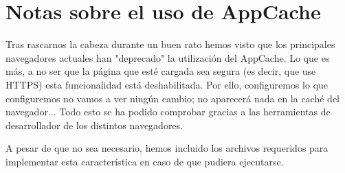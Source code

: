 \documentclass{article}[13pt]
\begin{document}
  \section{Notas sobre el uso de AppCache}
    Tras rascarnos la cabeza durante un buen rato hemos visto que los principales navegadores actuales han "deprecado" la utilización del AppCache. Lo que es más, a no ser que la página que esté cargada sea segura (es decir, que use HTTPS) esta funcionalidad está deshabilitada. Por ello, configuremos lo que configuremos no vamos a ver ningún cambio; no aparecerá nada en la caché del navegador... Todo esto se ha podido comprobar gracias a las herramientas de desarrollador de los distintos navegadores.

    A pesar de que no sea necesario, hemos incluido los archivos requeridos para implementar esta característica en caso de que pudiera ejecutarse.
\end{document}
